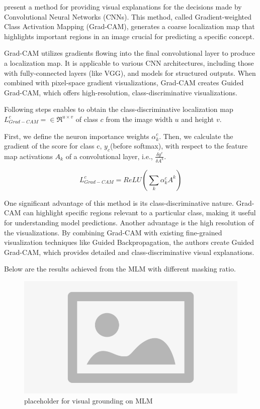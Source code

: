 \cite{gradcam} present a method for providing visual explanations for the decisions made by Convolutional Neural Networks (CNNs). This method, called Gradient-weighted Class Activation Mapping (Grad-CAM), generates a coarse localization map that highlights important regions in an image crucial for predicting a specific concept.

Grad-CAM utilizes gradients flowing into the final convolutional layer to produce a localization map. It is applicable to various CNN architectures, including those with fully-connected layers (like VGG), and models for structured outputs. When combined with pixel-space gradient visualizations, Grad-CAM creates Guided Grad-CAM, which offers high-resolution, class-discriminative visualizations.

Following steps enables to obtain the class-discriminative localization map $L^c_{Grad-CAM} = \in\Re^{u \times v}$ of class $c$ from the image width $u$ and height $v$. 

First, we define the neuron importance weights $\alpha^c_k$. Then, we calculate the gradient of the score for class c, $y_c$(before softmax), with respect to the feature map activations $A_k$ of a convolutional layer, i.e., $\frac{\delta y^c}{\delta A^k}$. 
 
\begin{displaymath}
    L^c_{Grad-CAM} = ReLU(\sum_k\alpha^c_kA^k)
\end{displaymath}

One significant advantage of this method is its class-discriminative nature. Grad-CAM can highlight specific regions relevant to a particular class, making it useful for understanding model predictions. Another advantage is the high resolution of the visualizations. By combining Grad-CAM with existing fine-grained visualization techniques like Guided Backpropagation, the authors create Guided Grad-CAM, which provides detailed and class-discriminative visual explanations.

Below are the results achieved from the MLM with different masking ratio.

\begin{figure}[htbp]
  \includegraphics[width=\linewidth]{img/placeholder.png}
  \caption{placeholder for visual grounding on MLM}
  \label{mlm_1}
\end{figure}

